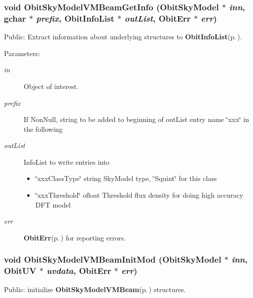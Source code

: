 \subsubsection{\setlength{\rightskip}{0pt plus 5cm}void Obit\-Sky\-Model\-VMBeam\-Get\-Info ({\bf Obit\-Sky\-Model} $\ast$ {\em inn}, gchar $\ast$ {\em prefix}, {\bf Obit\-Info\-List} $\ast$ {\em out\-List}, {\bf Obit\-Err} $\ast$ {\em err})}\label{ObitSkyModelVMBeam_8h_a15}


Public: Extract information about underlying structures to {\bf Obit\-Info\-List}{\rm (p.\,\pageref{structObitInfoList})}. 

\begin{Desc}
\item[Parameters:]
\begin{description}
\item[{\em in}]Object of interest. \item[{\em prefix}]If Non\-Null, string to be added to beginning of out\-List entry name \char`\"{}xxx\char`\"{} in the following \item[{\em out\-List}]Info\-List to write entries into \begin{itemize}
\item \char`\"{}xxx\-Class\-Type\char`\"{} string Sky\-Model type, \char`\"{}Squint\char`\"{} for this class \item \char`\"{}xxx\-Threshold\char`\"{} ofloat Threshold flux density for doing high accuracy DFT model \end{itemize}
\item[{\em err}]{\bf Obit\-Err}{\rm (p.\,\pageref{structObitErr})} for reporting errors. \end{description}
\end{Desc}
\subsubsection{\setlength{\rightskip}{0pt plus 5cm}void Obit\-Sky\-Model\-VMBeam\-Init\-Mod ({\bf Obit\-Sky\-Model} $\ast$ {\em inn}, {\bf Obit\-UV} $\ast$ {\em uvdata}, {\bf Obit\-Err} $\ast$ {\em err})}\label{ObitSkyModelVMBeam_8h_a7}


Public: initialize {\bf Obit\-Sky\-Model\-VMBeam}{\rm (p.\,\pageref{structObitSkyModelVMBeam})} structures. 

